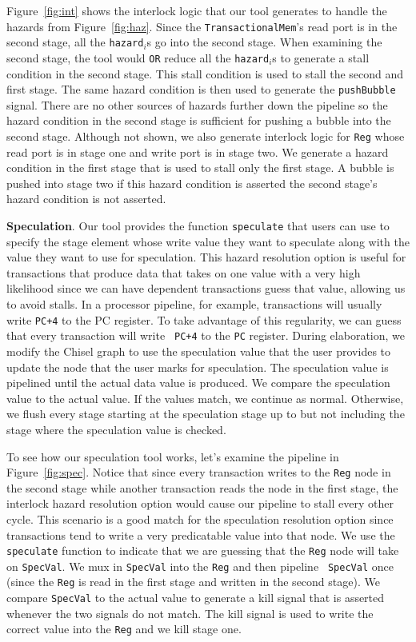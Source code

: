Figure~\ref{fig:int} shows the interlock logic that our tool
generates to handle the hazards from Figure~\ref{fig:haz}. Since
the {\tt TransactionalMem}'s read port is in the second stage, all the
{\tt hazard$_i$}s go into the second stage. When examining the second
stage, the tool would {\tt OR} reduce all the {\tt hazard}$_i$s to
generate a stall condition in the second stage. This stall condition
is used to stall the second and first stage. The same hazard
condition is then used to generate the {\tt pushBubble} signal. There
are no other sources of hazards further down the pipeline so the
hazard condition in the second stage is sufficient for pushing a
bubble into the second stage. Although not shown, we also generate
interlock logic for {\tt Reg} whose read port is in stage one and
write port is in stage two. We generate a hazard condition in the
first stage that is used to stall only the first stage. A bubble is
pushed into stage two if this hazard condition is asserted the second
stage's hazard condition is not asserted.

{\bf Speculation}. Our tool provides the function {\tt speculate} that
users can use to specify the stage element whose write value they want
to speculate along with the value they want to use for
speculation. This hazard resolution option is useful for transactions
that produce data that takes on one value with a very high likelihood
since we can have dependent transactions guess that value, allowing us
to avoid stalls. In a processor pipeline, for example, transactions
will usually write {\tt PC+4} to the PC register. To take advantage of
this regularity, we can guess that every transaction will write {\tt
  PC+4} to the {\tt PC} register. During elaboration, we modify the
Chisel graph to use the speculation value that the user provides to
update the node that the user marks for speculation. The speculation
value is pipelined until the actual data value is produced. We compare
the speculation value to the actual value. If the values match, we
continue as normal. Otherwise, we flush every stage starting at the
speculation stage up to but not including the stage where the
speculation value is checked.

To see how our speculation tool works, let's examine the pipeline in
Figure~\ref{fig:spec}. Notice that since every
transaction writes to the {\tt Reg} node in the second stage while
another transaction reads the node in the first stage, the interlock
hazard resolution option would cause our pipeline to stall every other
cycle. This scenario is a good match for the speculation resolution
option since transactions tend to write a very predicatable value into
that node. We use the {\tt speculate} function to indicate that we
are guessing that the {\tt Reg} node will take on {\tt SpecVal}. We
mux in {\tt SpecVal} into the {\tt Reg} and then pipeline {\tt
  SpecVal} once (since the {\tt Reg} is read in the first stage and
written in the second stage). We compare {\tt SpecVal} to the actual
value to generate a kill signal that is asserted whenever the two
signals do not match. The kill signal is used to write the correct
value into the {\tt Reg} and we kill stage one.

